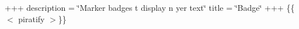 +++ description = \char`\"{}\+Marker badges t\textquotesingle{} display \textquotesingle{}n yer text\char`\"{} title = \char`\"{}\+Badge\char`\"{} +++ \{\{$<$ piratify $>$\}\} 
